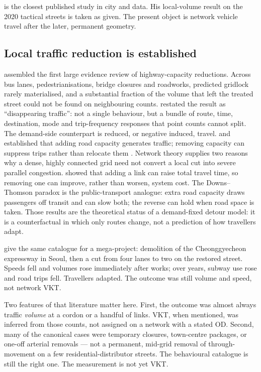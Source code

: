 \documentclass[a4paper,fleqn]{cas-dc}
\begin{document}
\citet{NelloDeakin2022} is the closest published study in city and data. His
local-volume result on the 2020 tactical streets is taken as given. The
present object is network vehicle travel after the later, permanent geometry.

\subsection{Local traffic reduction is established}

\citet{Cairns1998} assembled the first large evidence review of
highway-capacity reductions. Across bus lanes, pedestrianisations, bridge
closures and roadworks, predicted gridlock rarely materialised, and a
substantial fraction of the volume that left the treated street could not be
found on neighbouring counts. \citet{Cairns2002} restated the result as
``disappearing traffic'': not a single behaviour, but a bundle of route, time,
destination, mode and trip-frequency responses that point counts cannot split.
The demand-side counterpart is reduced, or negative induced, travel.
\citet{SACTRA1994} and \citet{Goodwin1996} established that adding road
capacity generates traffic; removing capacity can suppress trips rather than
relocate them \citep{Cairns1998,Cairns2002}. Network theory supplies two
reasons why a dense, highly connected grid need not convert a local cut into
severe parallel congestion. \citet{Braess1968} showed that adding a link can
raise total travel time, so removing one can improve, rather than worsen,
system cost. The {Downs}--{Thomson} paradox \citep{Downs1962,Thomson1977} is
the public-transport analogue: extra road capacity draws passengers off
transit and can slow both; the reverse can hold when road space is taken.
Those results are the theoretical status of a demand-fixed detour model: it
is a counterfactual in which only routes change, not a prediction of how
travellers adapt.

\citet{Chung2012} give the same catalogue for a mega-project: demolition of
the Cheonggyecheon expressway in Seoul, then a cut from four lanes to two on
the restored street. Speeds fell and volumes rose immediately after works;
over years, subway use rose and road trips fell. Travellers adapted. The
outcome was still volume and speed, not network VKT.

Two features of that literature matter here. First, the outcome was almost
always traffic \emph{volume} at a cordon or a handful of links. VKT, when
mentioned, was inferred from those counts, not assigned on a network with a
stated OD. Second, many of the canonical cases were temporary closures,
town-centre packages, or one-off arterial removals --- not a permanent,
mid-grid removal of through-movement on a few residential-distributor streets.
The behavioural catalogue is still the right one. The measurement is not yet
VKT.
\end{document}
